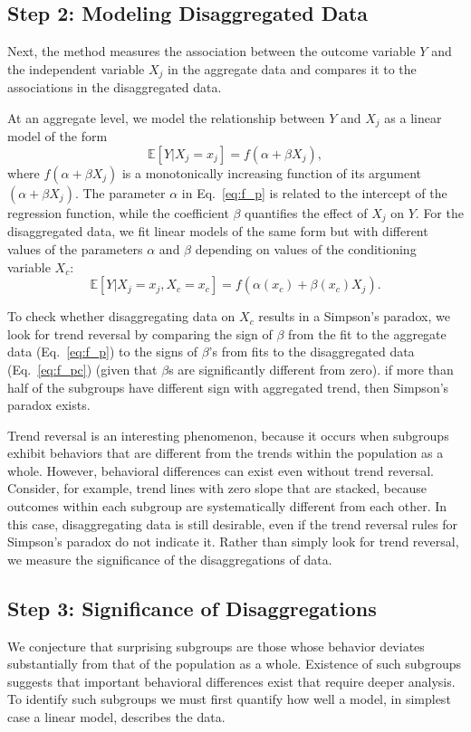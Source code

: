 \documentclass[letterpaper]{article} %
\begin{document}
\subsection{Step 2: Modeling Disaggregated Data}
Next, the method measures the association between the outcome variable $Y$ and the independent variable $X_j$ in the aggregate data and compares it to the associations in the disaggregated data.

At an aggregate level, we model the relationship between $Y$ and $X_j$ as a linear model of the form
\begin{equation}
	\mathbb{E}[Y|X_j = x_j] = f(\alpha + \beta X_j),
	\label{eq:f_p}
\end{equation}
where $f(\alpha + \beta X_j)$ is a monotonically increasing function of its argument $(\alpha + \beta X_j)$. The parameter $\alpha$ in Eq.~\eqref{eq:f_p} is related to the intercept of the regression function, while the coefficient $\beta $ quantifies the effect of $X_j$ on $Y$. For the disaggregated data, we fit linear models of the same form
but with different values of the parameters $\alpha$ and $\beta $ depending on values of the conditioning variable $X_c$:	
\begin{equation}
	\mathbb{E}[Y|X_j = x_j, X_c = x_c] = f(\alpha(x_c) + \beta (x_c)X_j).
	\label{eq:f_pc}
\end{equation}

To check whether disaggregating data on $X_c$ results in a Simpson's paradox, we look for trend reversal by comparing the sign of $\beta$ from the fit to the aggregate data (Eq.~\ref{eq:f_p}) to  the signs of $\beta$'s from fits to the disaggregated data (Eq.~\ref{eq:f_pc}) (given that $\beta$s are significantly different from zero).
if more than half of the subgroups have different sign with aggregated trend, then Simpson's paradox exists.

Trend reversal is an interesting phenomenon, because it occurs when subgroups exhibit behaviors that are different from the trends within the population as a whole. However, behavioral differences can exist even without trend reversal. Consider, for example, trend lines with zero slope that are stacked, because outcomes within each subgroup are systematically different from each other. In this case, disaggregating data is still desirable, even if the trend reversal rules for Simpson's paradox do not indicate it. Rather than simply look for trend reversal, we measure the significance of the disaggregations of data.

\subsection{Step 3: Significance of Disaggregations}
We conjecture that surprising subgroups are those whose behavior deviates substantially from that of the population as a whole.
Existence of such subgroups suggests that important behavioral differences exist that require deeper analysis. To identify such subgroups we must first quantify how well a model, in simplest case a linear model, describes the data.
\end{document}
